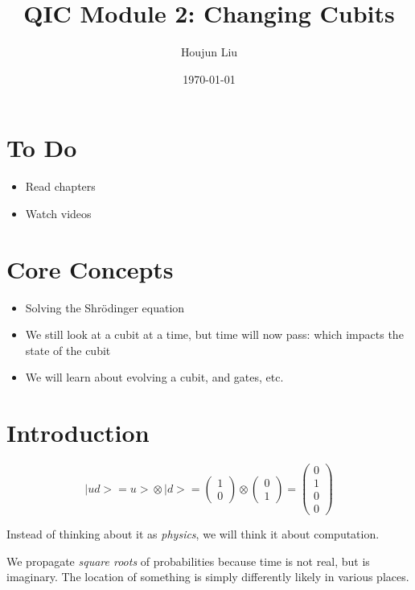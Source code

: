 \documentclass[letterpaper]{article}
\author{Houjun Liu}
\date{\today}
\title{QIC Module 2: Changing Cubits}
\renewcommand{\tableofcontents}{}
\renewcommand\maketitle{}
\begin{document}
\maketitle
\tableofcontents


\section{To Do}
\label{sec:org008742d}
\begin{itemize}
\item Read chapters
\item Watch videos
\end{itemize}

\section{Core Concepts}
\label{sec:orgf66603f}
\begin{itemize}
\item Solving the Shrödinger equation
\item We still look at a cubit at a time, but time will now pass: which impacts
the state of the cubit
\item We will learn about evolving a cubit, and gates, etc.
\end{itemize}

\section{Introduction}
\label{sec:org316b907}

\begin{equation}
   |ud \big> = u \big> \otimes |d\big> = \begin{pmatrix}
1 \\ 0 \end{pmatrix} \otimes \begin{pmatrix}
0 \\ 1 \end{pmatrix} = \begin{pmatrix}
0 \\ 1\\0\\0 \end{pmatrix}
\end{equation}

Instead of thinking about it as \emph{physics}, we will think it about computation.

We propagate \emph{square roots} of probabilities because time is not real, but is imaginary. The location of something is simply differently likely in various places.
\end{document}
